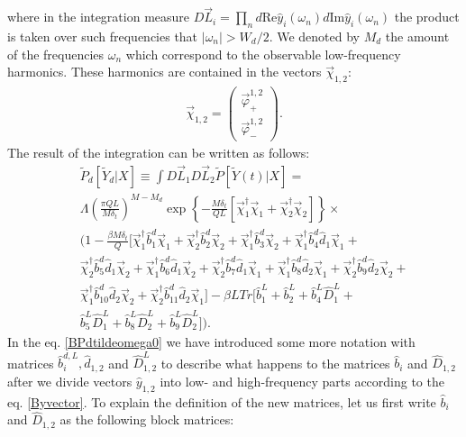\documentclass{article}
\begin{document}
where in the integration measure $D\vec{L}_{i} = \prod_{n} d \textrm{Re} \hat{y}_{i}(\omega_{n}) d \textrm{Im} \hat{y}_{i}(\omega_{n})$ the product is taken over such frequencies that $|\omega_{n}|>W_{d}/2$. We denoted by $M_{d}$ the amount of the frequencies $\omega_{n}$ which correspond to the observable low-frequency harmonics. These harmonics are contained in the vectors $\vec{\chi}_{1,2}$:
\begin{eqnarray}
    \vec{\chi}_{1, 2} = 
    \begin{pmatrix}
    \vec{\varphi}_{+}^{1,2}\\
    \vec{\varphi}_{-}^{1,2}
    \end{pmatrix}.
\end{eqnarray}
The result of the integration can be written as follows: 
\begin{eqnarray}\label{BPdtildeomega0}
    &&\tilde{P}_{d}[\tilde{Y}_{d}|X] \equiv \int D\vec{L}_{1}D\vec{L}_{2} \tilde{P}[\tilde{Y}(t)|X] = \nonumber \\
    &&\Lambda \left(\frac{\pi Q L}{M \delta_{t}}\right)^{M-M_{d}} \exp\left\{-\frac{M\delta_{t}}{QL}\left[\vec{\chi}_{1}^{\dag}\vec{\chi}_{1} + \vec{\chi}_{2}^{\dag}\vec{\chi}_{2}\right]\right\}\times\nonumber\\
    && \Big(1 - \frac{\beta M \delta_{t}}{Q} \Big[\vec{\chi}_{1}^{\dag}\hat{b}_{1}^{d}\vec{\chi}_{1} + \vec{\chi}_{2}^{\dag}\hat{b}_{2}^{d}\vec{\chi}_{2} + \vec{\chi}_{1}^{\dag}\hat{b}_{3}^{d}\vec{\chi}_{2} + \vec{\chi}_{1}^{\dag}\hat{b}_{4}^{d}\hat{d}_{1}\vec{\chi}_{1} + \nonumber\\
    && \vec{\chi}_{2}^{\dag}\hat{b}_{5}^{d}\hat{d}_{1}\vec{\chi}_{2} + 
    \vec{\chi}_{1}^{\dag}\hat{b}_{6}^{d}\hat{d}_{1}\vec{\chi}_{2} + 
    \vec{\chi}_{2}^{\dag}\hat{b}_{7}^{d}\hat{d}_{1}\vec{\chi}_{1} + 
    \vec{\chi}_{1}^{\dag}\hat{b}_{8}^{d}\hat{d}_{2}\vec{\chi}_{1} + 
    \vec{\chi}_{2}^{\dag}\hat{b}_{9}^{d}\hat{d}_{2}\vec{\chi}_{2} + \nonumber\\
    &&\vec{\chi}_{1}^{\dag}\hat{b}_{10}^{d}\hat{d}_{2}\vec{\chi}_{2} + 
    \vec{\chi}_{2}^{\dag}\hat{b}_{11}^{d}\hat{d}_{2}\vec{\chi}_{1}\Big] - \beta L  Tr\Big[\hat{b}_{1}^{L} + \hat{b}_{2}^{L} + \hat{b}_{4}^{L} \hat{D}_{1}^{L} + \nonumber\\
    && \hat{b}_{5}^{L} \hat{D}_{1}^{L} + \hat{b}_{8}^{L} \hat{D}_{2}^{L} + \hat{b}_{9}^{L} \hat{D}_{2}^{L} \Big]\Big).
\end{eqnarray}
In the eq. \eqref{BPdtildeomega0} we have introduced some more notation with matrices $\hat{b}_{i}^{d, L}, \hat{d}_{1,2}$ and $\hat{D}_{1,2}^{L}$ to describe what happens to the matrices $\hat{b}_{i}$ and $\hat{D}_{1,2}$ after we divide vectors $\hat{y}_{1,2}$ into low- and high-frequency parts according to the eq. \eqref{Byvector}. To explain the definition of the new matrices, let us first write $\hat{b}_{i}$ and $\hat{D}_{1,2}$ as the following block matrices:
\end{document}
